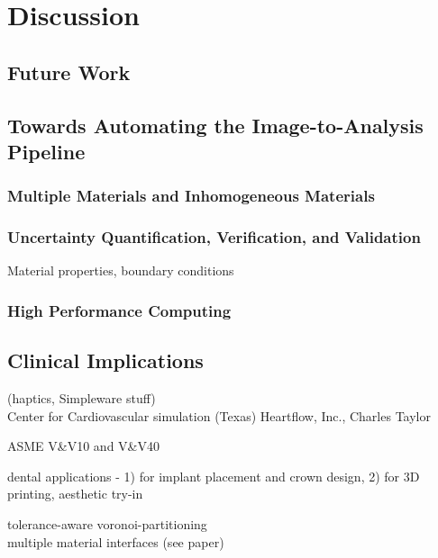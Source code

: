 \chapter{Discussion}
%

\section{Future Work}
\label{Future Work}
\section{Towards Automating the Image-to-Analysis Pipeline}
\label{Towards Automating the Image-to-Analysis Pipeline}
\subsection{Multiple Materials and Inhomogeneous Materials}
\label{Multiple Materials and Inhomogeneous Materials}
\subsection{Uncertainty Quantification, Verification, and Validation}
\label{Uncertainty Quantification, Verification, and Validation}
Material properties, boundary conditions
\subsection{High Performance Computing}
\label{High Performance Computing}
\section{Clinical Implications}
\label{Clinical Implications}
(haptics, Simpleware stuff)\\
Center for Cardiovascular simulation (Texas)
Heartflow, Inc., Charles Taylor

ASME V&V10 and V&V40

dental applications - 1) for implant placement and crown design, 2) for 3D printing, aesthetic try-in 

tolerance-aware voronoi-partitioning \\
multiple material interfaces (see paper) \\
